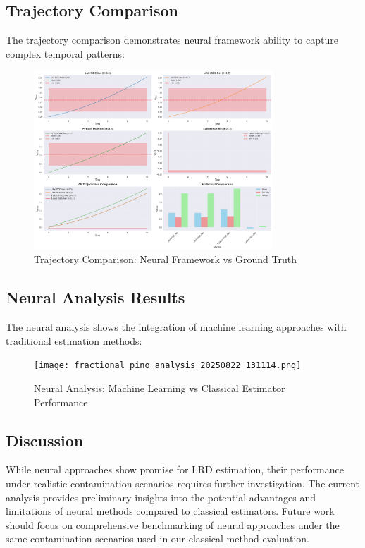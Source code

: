\subsection{Trajectory Comparison}

The trajectory comparison demonstrates neural framework ability to capture complex temporal patterns:

\begin{figure}[h]
\centering
\includegraphics[width=0.8\textwidth]{neural_fsde_trajectory_comparison.png}
\caption{Trajectory Comparison: Neural Framework vs Ground Truth}
\label{fig:trajectory_comparison}
\end{figure}

\subsection{Neural Analysis Results}

The neural analysis shows the integration of machine learning approaches with traditional estimation methods:

\begin{figure}[h]
\centering
\texttt{[image: fractional\_pino\_analysis\_20250822\_131114.png]}
\caption{Neural Analysis: Machine Learning vs Classical Estimator Performance}
\label{fig:neural_analysis}
\end{figure}

\subsection{Discussion}

While neural approaches show promise for LRD estimation, their performance under realistic contamination scenarios requires further investigation. The current analysis provides preliminary insights into the potential advantages and limitations of neural methods compared to classical estimators. Future work should focus on comprehensive benchmarking of neural approaches under the same contamination scenarios used in our classical method evaluation.
